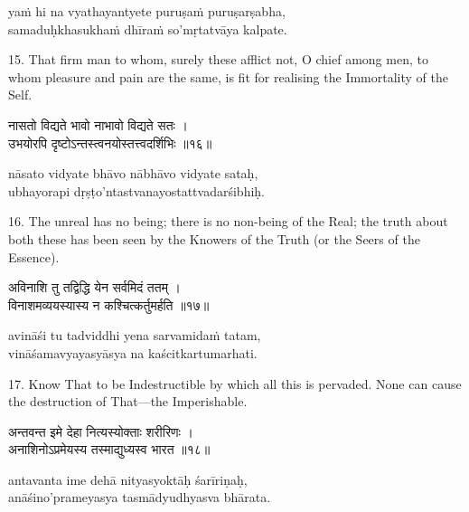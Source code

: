 \begin{transliteration}
yaṁ hi na vyathayantyete puruṣaṁ puruṣarṣabha, \\
samaduḥkhasukhaṁ dhīraṁ so'mṛtatvāya kalpate.
\end{transliteration}

15. That firm man to whom, surely these afflict not, O chief among men, to whom
pleasure and pain are the same, is fit for realising the Immortality of the
Self.

\begin{gitaverse}
नासतो विद्यते भावो नाभावो विद्यते सतः । \\
उभयोरपि दृष्टोऽन्तस्त्वनयोस्तत्त्वदर्शिभिः ॥१६॥
\end{gitaverse}

\begin{transliteration}
nāsato vidyate bhāvo nābhāvo vidyate sataḥ, \\
ubhayorapi dṛṣṭo'ntastvanayostattvadarśibhiḥ.
\end{transliteration}

16. The unreal has no being; there is no non-being of the Real; the truth about
both these has been seen by the Knowers of the Truth (or the Seers of the
Essence).

\begin{gitaverse}
अविनाशि तु तद्विद्धि येन सर्वमिदं ततम् । \\
विनाशमव्ययस्यास्य न कश्चित्कर्तुमर्हति ॥१७॥
\end{gitaverse}

\begin{transliteration}
avināśi tu tadviddhi yena sarvamidaṁ tatam, \\
vināśamavyayasyāsya na kaścitkartumarhati.
\end{transliteration}

17. Know That to be Indestructible by which all this is pervaded. None can
cause the destruction of That---the Imperishable.

\begin{gitaverse}
अन्तवन्त इमे देहा नित्यस्योक्ताः शरीरिणः । \\
अनाशिनोऽप्रमेयस्य तस्माद्युध्यस्व भारत ॥१८॥
\end{gitaverse}

\begin{transliteration}
antavanta ime dehā nityasyoktāḥ śarīriṇaḥ, \\
anāśino'prameyasya tasmādyudhyasva bhārata.
\end{transliteration}

